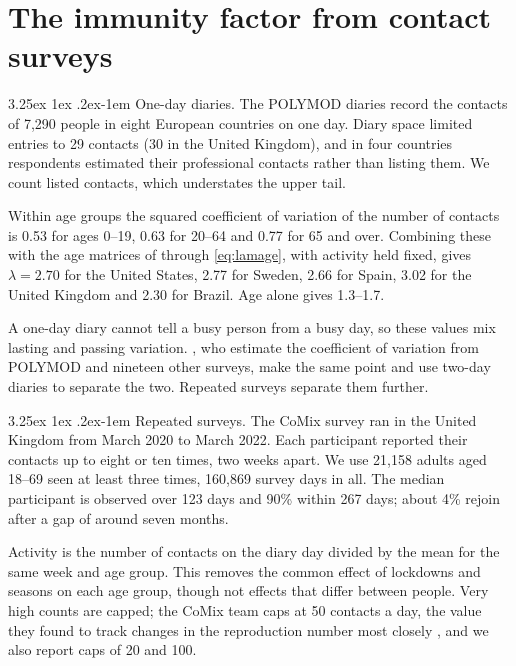 \documentclass[11pt]{article}
\makeatletter
\renewcommand\paragraph{\@startsection{paragraph}{4}{\z@}%
  {3.25ex \@plus1ex \@minus.2ex}{-1em}%
  {\normalfont\normalsize\itshape}}
\theoremstyle{remark}
\makeatother
\begin{document}
\section{The immunity factor from contact surveys}\label{sec:contacts}

\paragraph{One-day diaries.} The POLYMOD diaries \citep{mossong2008} record the contacts of 7,290 people in eight
European countries on one day. Diary space limited entries to 29 contacts (30 in the United Kingdom), and in four
countries respondents estimated their professional contacts rather than listing them. We count listed contacts, which
understates the upper tail.

Within age groups the squared coefficient of variation of the number of contacts is 0.53 for ages 0--19, 0.63 for
20--64 and 0.77 for 65 and over. Combining these with the age matrices of \citet{prem2021} through \eqref{eq:lamage},
with activity held fixed, gives $\lambda = 2.70$ for the United States, 2.77 for Sweden, 2.66 for Spain, 3.02 for the
United Kingdom and 2.30 for Brazil. Age alone gives 1.3--1.7.

A one-day diary cannot tell a busy person from a busy day, so these values mix lasting and passing variation.
\citet{gomes2022}, who estimate the coefficient of variation from POLYMOD and nineteen other surveys, make the same
point and use two-day diaries to separate the two. Repeated surveys separate them further.

\paragraph{Repeated surveys.} The CoMix survey \citep{jarvis2020,gimma2022,gimmadata2024} ran in the United Kingdom
from March 2020 to March 2022. Each participant reported their contacts up to eight or ten times, two weeks apart. We
use 21,158 adults aged 18--69 seen at least three times, 160,869 survey days in all. The median participant is
observed over 123 days and 90\% within 267 days; about 4\% rejoin after a gap of around seven months.

Activity is the number of contacts on the diary day divided by the mean for the same week and age group. This removes
the common effect of lockdowns and seasons on each age group, though not effects that differ between people. Very
high counts are capped; the CoMix team caps at 50 contacts a day, the value they found to track changes in the
reproduction number most closely \citep{gimma2022}, and we also report caps of 20 and 100.
\end{document}
